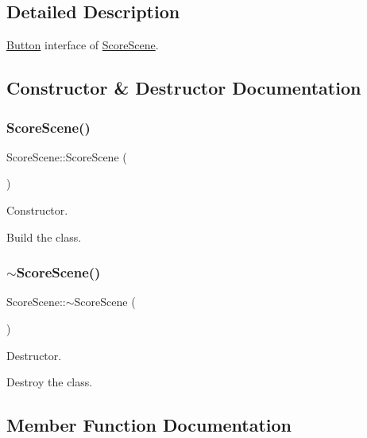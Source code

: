 \subsection{Detailed Description}
\hyperlink{classButton}{Button} interface of \hyperlink{classScoreScene}{Score\+Scene}. 

\subsection{Constructor \& Destructor Documentation}
\mbox{\label{classScoreScene_a832799285cf03c37c18c83d0adde2baa}} 
\subsubsection{\texorpdfstring{Score\+Scene()}{ScoreScene()}}
{\footnotesize\ttfamily Score\+Scene\+::\+Score\+Scene (\begin{DoxyParamCaption}{ }\end{DoxyParamCaption})}



Constructor. 

Build the class. \mbox{\label{classScoreScene_a1d3866f2c756fea86ec9adfb0a3eeb36}} 
\subsubsection{\texorpdfstring{$\sim$\+Score\+Scene()}{~ScoreScene()}}
{\footnotesize\ttfamily Score\+Scene\+::$\sim$\+Score\+Scene (\begin{DoxyParamCaption}{ }\end{DoxyParamCaption})}



Destructor. 

Destroy the class. 

\subsection{Member Function Documentation}
\mbox{\label{classScoreScene_ae398ba58a33b3605a0c71265202534e2}} 
